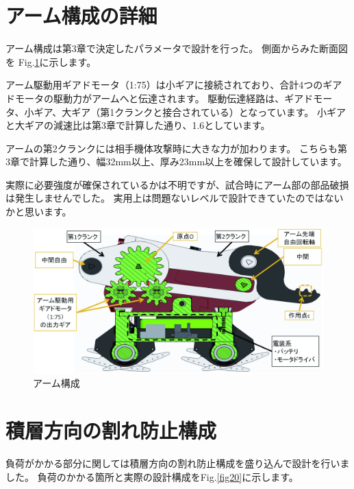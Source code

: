 \section{アーム構成の詳細}\label{ux30a2ux30fcux30e0ux69cbux6210ux306eux8a73ux7d30}

アーム構成は第3章で決定したパラメータで設計を行った。
側面からみた断面図を Fig.\ref{fig18}に示します。

アーム駆動用ギアドモータ（1:75）は小ギアに接続されており、合計4つのギアドモータの駆動力がアームへと伝達されます。
駆動伝達経路は、ギアドモータ、小ギア、大ギア（第1クランクと接合されている）となっています。
小ギアと大ギアの減速比は第3章で計算した通り、1.6としています。

アームの第2クランクには相手機体攻撃時に大きな力が加わります。
こちらも第3章で計算した通り、幅32mm以上、厚み23mm以上を確保して設計しています。

実際に必要強度が確保されているかは不明ですが、試合時にアーム部の部品破損は発生しませんでした。
実用上は問題ないレベルで設計できていたのではないかと思います。

\begin{figure}[htbp]
\centering
\includegraphics[width=380pt]{fig/fig18_cmyk.jpg}
\caption{アーム構成}
\label{fig18}
\end{figure}

\section{積層方向の割れ防止構成}\label{ux7a4dux5c64ux65b9ux5411ux306eux5272ux308cux9632ux6b62ux69cbux6210}

負荷がかかる部分に関しては積層方向の割れ防止構成を盛り込んで設計を行いました。
負荷のかかる箇所と実際の設計構成をFig.\ref{fig20}に示します。


